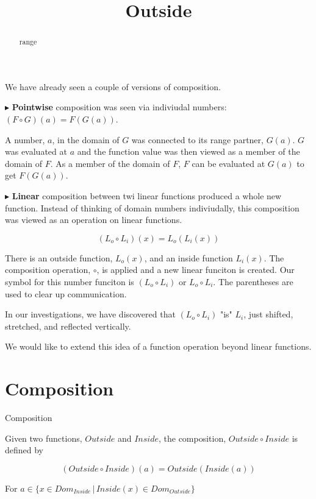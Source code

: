 \documentclass{ximera}
\title{Outside}
\begin{document}
\begin{abstract}
range
\end{abstract}
\maketitle







We have already seen a couple of versions of composition.

$\blacktriangleright$ \textbf{Pointwise} composition was seen via indiviudal numbers: $(F \circ G)(a) = F(G(a))$.

A number, $a$, in the domain of $G$ was connected to its range partner, $G(a)$.  $G$ was evaluated at $a$ and the function value was then viewed as a member of the domain of $F$.  As a member of the domain of $F$, $F$ can be evaluated at $G(a)$ to get $F(G(a))$.




$\blacktriangleright$ \textbf{Linear} composition between twi linear functions produced a whole new function.  Instead of thinking of domain numbers indiviudally, this composition was viewed as an operation on linear functions.

\[    (L_o \circ L_i)(x) = L_o(L_i(x))  \]

There is an outside function, $L_o(x)$, and an inside function $L_i(x)$.  The composition operation, $\circ$, is applied and a new linear funciton is created.  Our symbol for this number funciton is $(L_o \circ L_i)$ or $L_o \circ L_i$.  The parentheses are used to clear up communication.

In our investigations, we have discovered that $(L_o \circ L_i)$ "is" $L_i$, just shifted, stretched, and reflected vertically.


We would like to extend this idea of a function operation beyond linear functions.





\section{Composition}










\begin{definition} Composition


Given two functions, $Outside$ and $Inside$, the composition, $Outside \circ Inside$ is defined by

\[      (Outside \circ Inside)(a) = Outside(Inside(a))        \]

For $ a \in \{  x \in Dom_{Inside} \, | \,    Inside(x) \in Dom_{Outside}  \}$

\end{definition}
\end{document}
